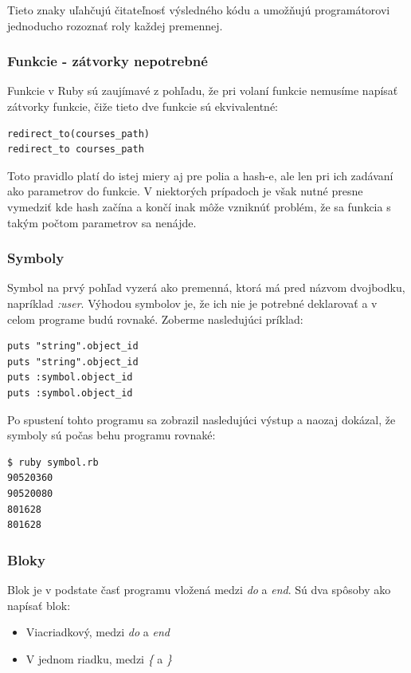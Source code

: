 Tieto znaky uľahčujú čitateľnosť výsledného kódu a umožňujú programátorovi jednoducho rozoznať roly každej premennej. \citep{web:rubylang}

\subsubsection{Funkcie - zátvorky nepotrebné }

Funkcie v Ruby sú zaujímavé z pohľadu, že pri volaní funkcie nemusíme napísať zátvorky funkcie, čiže tieto dve funkcie sú ekvivalentné:

\begin{verbatim}
redirect_to(courses_path)
redirect_to courses_path
\end{verbatim}

Toto pravidlo platí do istej miery aj pre polia a hash-e, ale len pri ich zadávaní ako parametrov do funkcie. V niektorých prípadoch je však nutné presne vymedziť kde hash začína a končí inak môže vzniknúť problém, že sa funkcia s takým počtom parametrov sa nenájde.

\subsubsection{Symboly}

Symbol na prvý pohľad vyzerá ako premenná, ktorá má pred názvom dvojbodku, napríklad \emph{:user}. Výhodou symbolov je, že ich nie je potrebné deklarovať a v celom programe budú rovnaké. Zoberme nasledujúci príklad:

\begin{verbatim}
puts "string".object_id
puts "string".object_id
puts :symbol.object_id
puts :symbol.object_id
\end{verbatim}

Po spustení tohto programu sa zobrazil nasledujúci výstup a naozaj dokázal, že symboly sú počas behu programu rovnaké:

\begin{verbatim}
$ ruby symbol.rb
90520360
90520080
801628
801628
\end{verbatim}

\subsubsection{Bloky}

Blok je v podstate časť programu vložená medzi \emph{do} a \emph{end}. Sú dva spôsoby ako napísať blok:

\begin{itemize}
    \item Viacriadkový, medzi \emph{do} a \emph{end}
    \item V jednom riadku, medzi \emph{\{} a \emph{\}}
\end{itemize}

